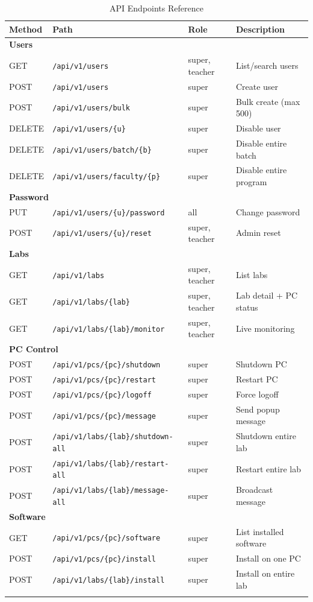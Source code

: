 ﻿\documentclass[12pt,a4paper]{article}
\begin{document}
\begin{longtable}{l l l p{4.5cm}}
\toprule
\textbf{Method} & \textbf{Path} & \textbf{Role} & \textbf{Description} \\
\midrule
\endhead
\multicolumn{4}{l}{\textbf{Users}} \\
\midrule
GET & \texttt{/api/v1/users} & super, teacher & List/search users \\
POST & \texttt{/api/v1/users} & super & Create user \\
POST & \texttt{/api/v1/users/bulk} & super & Bulk create (max 500) \\
DELETE & \texttt{/api/v1/users/\{u\}} & super & Disable user \\
DELETE & \texttt{/api/v1/users/batch/\{b\}} & super & Disable entire batch \\
DELETE & \texttt{/api/v1/users/faculty/\{p\}} & super & Disable entire program \\
\midrule
\multicolumn{4}{l}{\textbf{Password}} \\
\midrule
PUT & \texttt{/api/v1/users/\{u\}/password} & all & Change password \\
POST & \texttt{/api/v1/users/\{u\}/reset} & super, teacher & Admin reset \\
\midrule
\multicolumn{4}{l}{\textbf{Labs}} \\
\midrule
GET & \texttt{/api/v1/labs} & super, teacher & List labs \\
GET & \texttt{/api/v1/labs/\{lab\}} & super, teacher & Lab detail + PC status \\
GET & \texttt{/api/v1/labs/\{lab\}/monitor} & super, teacher & Live monitoring \\
\midrule
\multicolumn{4}{l}{\textbf{PC Control}} \\
\midrule
POST & \texttt{/api/v1/pcs/\{pc\}/shutdown} & super & Shutdown PC \\
POST & \texttt{/api/v1/pcs/\{pc\}/restart} & super & Restart PC \\
POST & \texttt{/api/v1/pcs/\{pc\}/logoff} & super & Force logoff \\
POST & \texttt{/api/v1/pcs/\{pc\}/message} & super & Send popup message \\
POST & \texttt{/api/v1/labs/\{lab\}/shutdown-all} & super & Shutdown entire lab \\
POST & \texttt{/api/v1/labs/\{lab\}/restart-all} & super & Restart entire lab \\
POST & \texttt{/api/v1/labs/\{lab\}/message-all} & super & Broadcast message \\
\midrule
\multicolumn{4}{l}{\textbf{Software}} \\
\midrule
GET & \texttt{/api/v1/pcs/\{pc\}/software} & super & List installed software \\
POST & \texttt{/api/v1/pcs/\{pc\}/install} & super & Install on one PC \\
POST & \texttt{/api/v1/labs/\{lab\}/install} & super & Install on entire lab \\
\bottomrule
\caption{API Endpoints Reference}
\end{longtable}
\end{document}
